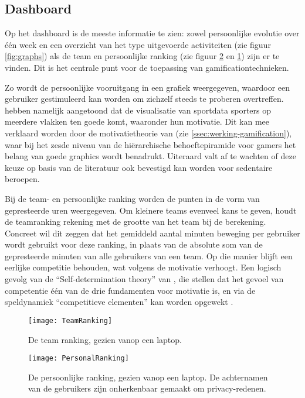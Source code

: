 \subsection{Dashboard}
Op het dashboard is de meeste informatie te zien: zowel persoonlijke evolutie over één week en een overzicht van het type uitgevoerde activiteiten (zie figuur \ref{fig:graphs}) als de team en persoonlijke ranking (zie figuur \ref{fig:personalRanking} en \ref{fig:teamRanking}) zijn er te vinden. Dit is het centrale punt voor de toepassing van gamificationtechnieken.

Zo wordt de persoonlijke vooruitgang in een grafiek weergegeven, waardoor een gebruiker gestimuleerd kan worden om zichzelf steeds te proberen overtreffen. \linebreak \textcite{Schiewe2020} hebben namelijk aangetoond dat de visualisatie van sportdata sporters op meerdere vlakken ten goede komt, waaronder hun motivatie. Dit kan mee verklaard worden door de motivatietheorie van \textcite{Siang2003} (zie \ref{ssec:werking-gamification}), waar bij het zesde niveau van de hiërarchische behoeftepiramide voor gamers het belang van goede graphics wordt benadrukt. Uiteraard valt af te wachten of deze keuze op basis van de literatuur ook bevestigd kan worden voor sedentaire beroepen.

Bij de team- en persoonlijke ranking worden de punten in de vorm van gepresteerde uren weergegeven. Om kleinere teams evenveel kans te geven, houdt de teamranking rekening met de grootte van het team bij de berekening. Concreet wil dit zeggen dat het gemiddeld aantal minuten beweging per gebruiker wordt gebruikt voor deze ranking, in plaats van de absolute som van de gepresteerde minuten van alle gebruikers van een team. Op die manier blijft een eerlijke competitie behouden, wat volgens \textcite{Ivanova2019} de motivatie verhoogt. Een logisch gevolg van de “Self-determination theory” van \textcite{Deci1985}, die stellen dat het gevoel van competentie één van de drie fundamenten voor motivatie is, en via de speldynamiek “competitieve elementen” kan worden opgewekt \autocite{Kam2018}.

\begin{figure}[h]
    \caption[Team ranking]{De team ranking, gezien vanop een laptop.}
    \texttt{[image: TeamRanking]}
    \label{fig:teamRanking}
\end{figure}

\begin{figure}[h]
    \caption[Persoonlijke ranking]{De persoonlijke ranking, gezien vanop een laptop. De achternamen van de gebruikers zijn onherkenbaar gemaakt om privacy-redenen.}
    \texttt{[image: PersonalRanking]}
    \label{fig:personalRanking}
\end{figure}

